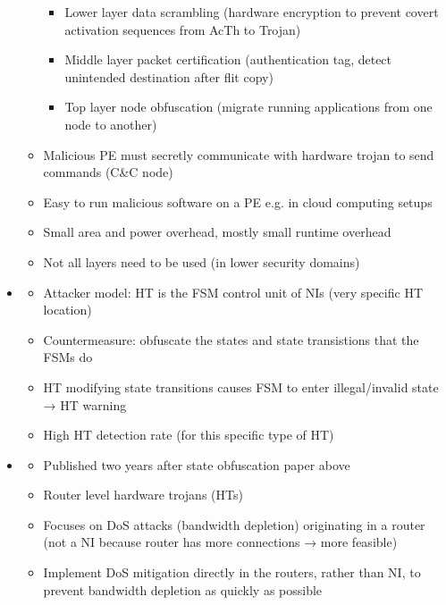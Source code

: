 \begin{itemize}
\begin{itemize}
                \begin{itemize}
                    \item Lower layer data scrambling (hardware encryption to prevent covert activation sequences from AcTh to Trojan)
                    \item Middle layer packet certification (authentication tag, detect unintended destination after flit copy)
                    \item Top layer node obfuscation (migrate running applications from one node to another)
                \end{itemize}
            \item Malicious PE must secretly communicate with hardware trojan to send commands (C\&C node)
            \item Easy to run malicious software on a PE e.g. in cloud computing setups
            \item Small area and power overhead, mostly small runtime overhead
            \item Not all layers need to be used (in lower security domains)
        \end{itemize}
    \item \textbf{}
        \begin{itemize}
            \item Attacker model: HT is the FSM control unit of NIs (very specific HT location)
            \item Countermeasure: obfuscate the states and state transistions that the FSMs do
            \item HT modifying state transitions causes FSM to enter illegal/invalid state → HT warning
            \item High HT detection rate (for this specific type of HT)
        \end{itemize}
    \item \textbf{}
        \begin{itemize}
            \item Published two years after state obfuscation paper above
            \item Router level hardware trojans (HTs)
            \item Focuses on DoS attacks (bandwidth depletion) originating in a router (not a NI because router has more connections → more
                feasible)
            \item Implement DoS mitigation directly in the routers, rather than NI, to prevent bandwidth depletion as quickly as possible

\end{itemize}
\end{itemize}
